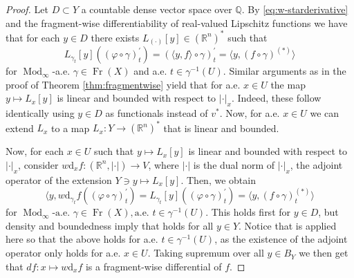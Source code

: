 \documentclass{amsart}
\numberwithin{equation}{section}
\newcommand{\R}{\mathbb{R}}
\newcommand{\Q}{\mathbb{Q}}
\newcommand{\Mod}{\operatorname{Mod}}
\newcommand{\LIP}{\operatorname{LIP}}
\newcommand{\Fr}{\operatorname{Fr}}
\newcommand{\ud}{\mathrm {d}}
\begin{document}
\begin{proof}
	Let $D\subset Y$ a countable dense vector space over $\Q$. By \eqref{eq:w-starderivative} and the fragment-wise differentiability of real-valued Lipschitz functions \cite[Theorem 1.2]{tsd24} we have that for each $y\in D$ there exists  $L_{(\cdot )}[y]\in (\R^n )^*$ such that
    \begin{equation}\label{eq:w-starfw}
    L_{\gamma_t}[y]((\varphi\circ\gamma )^\prime_t)=(\langle y,f\rangle \circ\gamma )^\prime_t =\langle y,(f\circ\gamma )^{(*)}\rangle 
    \end{equation}
    for $\Mod_\infty$-a.e. $\gamma\in \Fr (X)$ and a.e. $t\in \gamma^{-1}(U)$. 
    Similar arguments as in the proof of Theorem \ref{thm:fragmentwise} yield that for a.e. $x\in U$ the map $y\mapsto L_x[y]$ is linear and bounded with respect to $|\cdot|_x$. Indeed, these follow identically using $y\in D$ as functionals instead of $v^*$. Now, for a.e. $x\in U$ we can extend $L_x$ to a map $L_x:Y\to (\R^n)^*$ that is linear and bounded.

Now, for each $x\in U$ such that $y\mapsto L_x[y]$ is linear and bounded with respect to $|\cdot|_x$, consider $w\ud_xf:(\R^n,|\cdot |)\rightarrow V$, where $|\cdot|$ is the dual norm of $|\cdot|_x$, the adjoint operator of the extension $Y\ni y\mapsto L_x[y]$. Then, we obtain
     \[ 
     \langle y, w\ud_{\gamma_t}f((\varphi\circ\gamma )^\prime_t)= L_{\gamma_t}[y]((\varphi\circ\gamma )^\prime_t) =\langle y,(f\circ\gamma )^{(*)}_t\rangle 
     \]
     for $\Mod_\infty \mbox{-a.e. } \gamma\in \Fr (X), \mbox{a.e. }t\in\gamma^{-1 }(U)$. This holds first for $y\in D$, but density and boundedness imply that holds for all $y\in Y$. Notice that \cite[Lemma 2.7]{tsd24} is applied here so that the above holds for a.e. $t\in \gamma^{-1}(U)$, as the existence of the adjoint operator only holds for a.e. $x\in U$.
     Taking supremum over all $y\in B_Y$ we then get that $df:x\mapsto w\ud_xf$ is a fragment-wise differential of $f$.
\end{proof}
\end{document}
